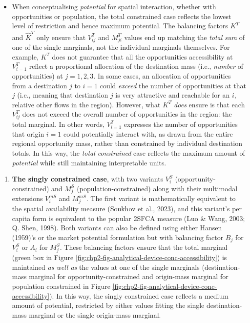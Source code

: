 \documentclass[
11pt, %
oneside, %
english, %
singlespacing, %
]{macthesis} %
\def\tightlist{}
\begin{document}
\begin{itemize}
\tightlist
\item
  When conceptualising \emph{potential} for spatial interaction, whether with opportunities or population, the total constrained case reflects the lowest level of restriction and hence maximum potential. The balancing factors \(K^T\) and \(\hat K^T\) only ensure that \(V_{ij}^T\) and \(M_{ji}^T\) values end up matching the \emph{total sum} of one of the single marginals, not the individual marginals themselves. For example, \(K^T\) does not guarantee that all the opportunities accessibility at \(V_{i=1}^T\) reflect a proportional allocation of the destination mass (i.e., \emph{number} of opportunities) at \(j=1, 2, 3\). In some cases, an allocation of opportunities from a destination \(j\) to \(i=1\) could \emph{exceed} the number of opportunities at that \(j\) (i.e., meaning that destination \(j\) is very attractive and reachable for an \(i\), relative other flows in the region). However, what \(K^T\) \emph{does} ensure is that each \(V_{ij}^T\) does not exceed the overall number of opportunities in the region: the total marginal. In other words, \(V_{i=1}^T\) expresses the number of opportunities that origin \(i=1\) could potentially interact with, as drawn from the entire regional opportunity mass, rather than constrained by individual destination totals. In this way, the \emph{total constrained} case reflects the maximum amount of \emph{potential} while still maintaining interpretable units.
\end{itemize}

\begin{enumerate}
\def\labelenumi{\arabic{enumi}.}
\setcounter{enumi}{2}
\tightlist
\item
  \textbf{The singly constrained case}, with two variants \(V_i^S\) (opportunity-constrained) and \(M_j^S\) (population-constrained) along with their multimodal extensions \(V_i^{mS}\) and \(M_j^{mS}\). The first variant is mathematically equivalent to the spatial availability measure (Soukhov et al., 2023), and this variant's per capita form is equivalent to the popular 2SFCA measure (Luo \& Wang, 2003; Q. Shen, 1998). Both variants can also be defined using either Hansen (1959)'s or the market potential formulation but with balancing factor \(B_j\) for \(V_i^S\) or \(A_i\) for \(M_j^S\). These balancing factors ensure that the total marginal (green box in Figure \ref{fig:chp2-fig-analytical-device-conc-accessibility}) is maintained \emph{as well as} the values at one of the single marginals (destination-mass marginal for opportunity-constrained and origin-mass marginal for population constrained in Figure \ref{fig:chp2-fig-analytical-device-conc-accessibility}). In this way, the singly constrained case reflects a medium amount of potential, restricted by either values fitting the single destination-mass marginal or the single origin-mass marginal.
\end{enumerate}
\end{document}
